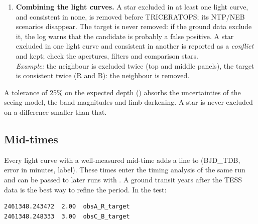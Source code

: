 \documentclass[11pt,a4paper]{report}
\newcommand{\code}[1]{\path{#1}}
\begin{document}
\begin{enumerate}
\item \textbf{Combining the light curves.} A star excluded in at least one
light curve, and consistent in none, is removed before TRICERATOPS; its
NTP/NEB scenarios disappear. The target is never removed: if the ground
data exclude it, the log warns that the candidate is probably a false
positive. A star excluded in one light curve and consistent in another is
reported as a \emph{conflict} and kept; check the apertures, filters and
comparison stars.\\
\emph{Example:} the neighbour is excluded twice (top and middle panels), the
target is consistent twice (R and B): the neighbour is removed.
\end{enumerate}

A tolerance of 25\% on the expected depth (\code{--ground-depth-tol})
absorbs the uncertainties of the seeing model, the band magnitudes and limb
darkening. A star is never excluded on a difference smaller than that.




\subsection{Mid-times}
Every light curve with a well-measured mid-time adds a line to
\code{ground_times_<TIC>.txt} (BJD\_TDB, error in minutes, label). These
times enter the timing analysis of the same run and can be passed to later
runs with \code{--extra-times}. A ground transit years after the TESS data
is the best way to refine the period. In the test:
\begin{lstlisting}
2461348.243472  2.00  obsA_R_target
2461348.248333  3.00  obsC_B_target
\end{lstlisting}
\end{document}
